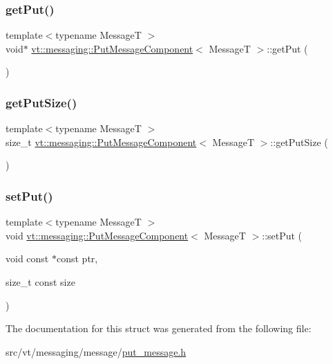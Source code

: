 \subsubsection{\texorpdfstring{get\+Put()}{getPut()}}
{\footnotesize\ttfamily template$<$typename MessageT $>$ \\
void$\ast$ \hyperlink{structvt_1_1messaging_1_1_put_message_component}{vt\+::messaging\+::\+Put\+Message\+Component}$<$ MessageT $>$\+::get\+Put (\begin{DoxyParamCaption}{ }\end{DoxyParamCaption})\hspace{0.3cm}{\ttfamily [inline]}}

\mbox{\label{structvt_1_1messaging_1_1_put_message_component_ae5301d5d0a69192e2d5a3fe822f7406b}} 
\subsubsection{\texorpdfstring{get\+Put\+Size()}{getPutSize()}}
{\footnotesize\ttfamily template$<$typename MessageT $>$ \\
size\+\_\+t \hyperlink{structvt_1_1messaging_1_1_put_message_component}{vt\+::messaging\+::\+Put\+Message\+Component}$<$ MessageT $>$\+::get\+Put\+Size (\begin{DoxyParamCaption}{ }\end{DoxyParamCaption})\hspace{0.3cm}{\ttfamily [inline]}}

\mbox{\label{structvt_1_1messaging_1_1_put_message_component_a013b0a95bc725bb1f18373e286c077cb}} 
\subsubsection{\texorpdfstring{set\+Put()}{setPut()}}
{\footnotesize\ttfamily template$<$typename MessageT $>$ \\
void \hyperlink{structvt_1_1messaging_1_1_put_message_component}{vt\+::messaging\+::\+Put\+Message\+Component}$<$ MessageT $>$\+::set\+Put (\begin{DoxyParamCaption}\item[{void const $\ast$const}]{ptr,  }\item[{size\+\_\+t const}]{size }\end{DoxyParamCaption})\hspace{0.3cm}{\ttfamily [inline]}}



The documentation for this struct was generated from the following file\+:\begin{DoxyCompactItemize}
\item 
src/vt/messaging/message/\hyperlink{put__message_8h}{put\+\_\+message.\+h}\end{DoxyCompactItemize}
